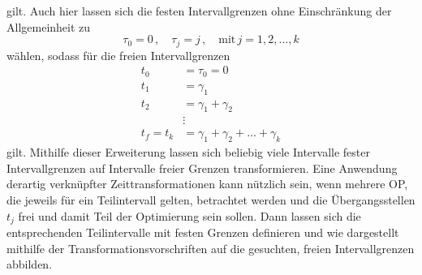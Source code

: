 gilt. Auch hier lassen sich die festen Intervallgrenzen ohne Einschränkung der Allgemeinheit zu
\begin{equation}
	\tau_0 = 0\,, \quad\tau_j = j\,, \quad\textrm{mit}\, j=1,2,...,k
\end{equation}
wählen, sodass für die freien Intervallgrenzen 
\begin{align}
t_0 &= \tau_0 = 0\\
t_1 &= \gamma_1 \\
t_2 &= \gamma_1+\gamma_2 \\ 
\nonumber &\vdots\\ 
t_f = t_k &= \gamma_1+\gamma_2+\dots+\gamma_k 
\end{align}
gilt. Mithilfe dieser Erweiterung lassen sich beliebig viele Intervalle fester Intervallgrenzen auf Intervalle freier Grenzen transformieren. Eine Anwendung derartig verknüpfter Zeittransformationen kann nützlich sein, wenn mehrere \gls{OP}, die jeweils für ein Teilintervall gelten, betrachtet werden und die Übergangsstellen $t_j$ frei und damit Teil der Optimierung sein sollen. Dann lassen sich die entsprechenden Teilintervalle mit festen Grenzen definieren und wie dargestellt mithilfe der Transformationsvorschriften auf die gesuchten, freien Intervallgrenzen abbilden.
